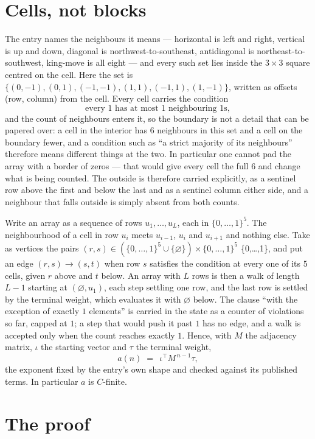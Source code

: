 \documentclass[11pt,a4paper]{article}
\theoremstyle{plain}
\theoremstyle{definition}
\begin{document}
\section{Cells, not blocks}

The entry names the neighbours it means --- horizontal is left and right, vertical is up and
down, diagonal is northwest-to-southeast, antidiagonal is northeast-to-southwest, king-move is
all eight --- and every such set lies inside the $3\times3$ square centred on the cell. Here
the set is $\{(0,-1), (0,1), (-1,-1), (1,1), (-1,1), (1,-1)\}$, written as offsets (row, column) from the cell. Every cell carries
the condition
\[
\text{every 1 has at most 1 neighbouring 1s},
\]
and the count of neighbours enters it, so the boundary is not a detail that can be papered
over: a cell in the interior has $6$ neighbours in this set and a cell on the boundary
fewer, and a condition such as ``a strict majority of its neighbours'' therefore means
different things at the two. In particular one cannot pad the array with a border of zeros ---
that would give every cell the full $6$ and change what is being counted. The outside is
therefore carried
explicitly, as a sentinel row above the first and below the last and as a sentinel column
either side, and a neighbour that falls outside is simply absent from both counts.

Write an array as a sequence of rows $u_1,\dots,u_L$, each in
$\{0,\dots,1\}^{5}$. The neighbourhood of a cell in row $u_i$ meets $u_{i-1}$,
$u_i$ and $u_{i+1}$ and nothing else. Take as vertices the pairs
$(r,s)\in(\{0,\dots,1\}^{5}\cup\{\varnothing\})\times\{0,\dots,1\}^{5}$ \times \{0,\dots,1\},
and put an edge $(r,s)\to(s,t)$ when row $s$ satisfies the condition at every one of its
$5$ cells, given $r$ above and $t$ below. An array with $L$ rows is then a walk of length
$L-1$ starting at $(\varnothing,u_1)$, each step settling one row, and the last row is
settled by the terminal weight, which evaluates it with $\varnothing$ below. The clause ``with the exception of exactly $1$ elements'' is carried in
the state as a counter of violations so far, capped at $1$; a step that would push it past
$1$ has no edge, and a walk is accepted only when the count reaches exactly $1$. Hence,
with $M$ the adjacency matrix, $\iota$ the starting vector and $\tau$ the terminal weight,
\[
a(n)\;=\;\,\iota^{\!\top}M^{\,n-1}\tau ,
\]
the exponent fixed by the entry's own shape and checked against its published terms. In
particular $a$ is $C$-finite.

\section{The proof}
\end{document}
